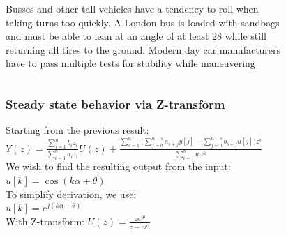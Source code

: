 \begin{frame}
	\begin{columns}
		\begin{column}{0.6\textwidth}
			Busses and other tall vehicles have a tendency to roll when taking turns too quickly.
			A London bus is loaded with sandbags and must be able to lean at an angle of at least 28 while still returning all tires to the ground.
			Modern day car manufacturers have to pass multiple tests for stability while maneuvering
		\end{column}
		\begin{column}{0.4\textwidth}
			\begin{figure}
				\centering
				\includegraphics[width=0.8\linewidth]{Images/discrete_time_systems_32}
				\label{fig:discrete_time_systems_32}
			\end{figure}
		\end{column}
	\end{columns}
\end{frame}
\begin{frame}
	\frametitle{Steady state behavior via Z-transform}
	Starting from the previous result:\\
	$Y(z) = \frac{\sum\limits_{i=1}^{n} b_i z_i}{\sum\limits_{i=1}^{n} a_i z_i} U(z) + \frac{\sum\limits_{s=1}^{n}\Bigg(\sum\limits_{j=0}^{n-s}a_{s+j}y[j]-\sum\limits_{j=0}^{n-s}b_{s+j}u[j]\Bigg)z^{s}}{\sum\limits_{i=1}^{n}a_i z^i}$\\
	We wish to find the resulting output from the input:\\
	$ u[k] = \cos(k\alpha + \theta)$\\
	To simplify derivation, we use:\\
	$u[k] = e^{j(k\alpha + \theta)}$\\
	With Z-transform:	$U(z) = \frac{ze^{j\theta}}{z-e^{j\alpha}}$
	
\end{frame}
